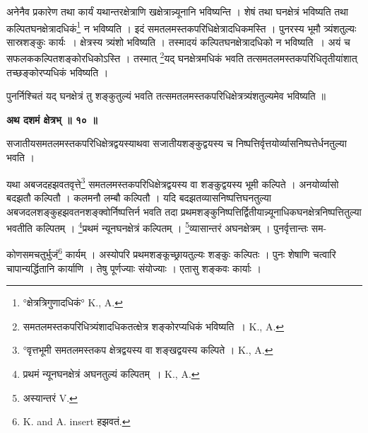 \documentclass[11pt, openany]{book}
\begin{document}
अनेनैव प्रकारेण तथा कार्यं यथान्तरक्षेत्राणि खक्षेत्रान्न्यूनानि भविष्यन्ति । शेषं तथा घनक्षेत्रं भविष्यति तथा कल्पितघनक्षेत्रादधिकं\renewcommand{\thefootnote}{१}\footnote{°क्षेत्रत्रिगुणादधिकं° {\en K., A.}} न भविष्यति । इदं समतलमस्तकपरिधिक्षेत्रादधिकमस्ति । पुनरस्य भूमौ त्र्यंशतुल्यः सास्रशङ्कुः कार्यः~। क्षेत्रस्य त्र्यंशो भविष्यति । तस्मादयं कल्पितघनक्षेत्रादधिको न भविष्यति~। अयं च सफलककल्पितशङ्कोरधिकोऽस्ति । तस्मात् \renewcommand{\thefootnote}{२}\footnote{समतलमस्तकपरिधित्र्यंशादधिकतत्क्षेत्र शङ्कोरप्यधिकं भविष्यति~। {\en K., A.}}यद् घनक्षेत्रमधिकं भवति तत्समतलमस्तकपरिधितृतीयांशात् तच्छङ्कोरप्यधिकं भविष्यति । \\
\vspace{3mm}

पुनर्निश्चितं यद् घनक्षेत्रं तु शङ्कुतुल्यं भवति तत्समतलमस्तकपरिधिक्षेत्रत्र्यंशतुल्यमेव भविष्यति ॥ \\
\vspace{3mm}

\begin{center}
\textbf{\large अथ दशमं क्षेत्रभ् ॥ १० ॥ }
\end{center}
\vspace{5mm}

{\ab सजातीयसमतलमस्तकपरिधिक्षेत्रद्वयस्याथवा सजातीयशङ्कुद्वयस्य च निष्पत्तिर्वृत्तयोर्व्यासनिष्पत्तेर्धनतुल्या भवति । }\\
\vspace{5mm}

यथा अबजदहझवतवृत्ते\renewcommand{\thefootnote}{३}\footnote{°वृत्तभूमी समतलमस्तकप क्षेत्रद्वयस्य वा शङ्खद्वयस्य कल्पिते । {\en K., A.}} समतलमस्तकपरिधिक्षेत्रद्वयस्य वा शङ्कुद्वयस्य भूमी कल्पिते । अनयोर्व्यासो बदझतौ कल्पितौ । कलमनौ लम्बौ कल्पितौ । यदि बदझतव्यासनिष्पत्तिघनतुल्या अबजदलशङ्कुहझवतनशङ्क्वोर्निष्पत्तिर्न भवति तदा प्रथमशङ्कुनिष्पत्तिर्द्वितीयान्न्यूनाधिकघनक्षेत्रनिष्पत्तितुल्या भवतीति कल्पितम् ।
\renewcommand{\thefootnote}{४}\footnote{प्रथमं न्यूनघनक्षेत्रं अघनतुल्यं कल्पितम्~। {\en K., A.}}प्रथमं न्यूनघनक्षेत्रं कल्पितम् । \renewcommand{\thefootnote}{५}\footnote{अस्यान्तरं {\en V.}}व्यासान्तरं अघनक्षेत्रम् । पुनर्वृत्तान्तः सम- 

\newpage
\noindent कोणसमचतुर्भुजं\renewcommand{\thefootnote}{१}\footnote{{\en K. and A. insert} हझवतं.} कार्यम् । अस्योपरि प्रथमशङ्कूच्छ्रायतुल्यः शङ्कुः कल्पितः । पुनः शेषाणि चत्वारि चापान्यर्द्धितानि कार्याणि । तेषु पूर्णज्याः संयोज्याः । एतासु शङ्कवः कार्याः । \\
\vspace{5mm}
\end{document}
